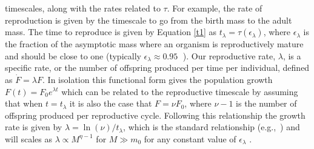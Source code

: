 \documentclass[twocolumn,preprintnumbers,amsmath,amssymb,superscriptaddress]{revtex4}
\begin{document}
\begin{bibunit}[unsrt]
{  timescales, along with the rates related to $\tau$.  For example, the rate of
  reproduction is given by the timescale to go from the birth mass to the adult
  mass. The time to reproduce is given by Equation \ref{t1} as
  $t_{\lambda}=\tau\left(\epsilon_{\lambda}\right)$, where $\epsilon_{\lambda}$
  is the fraction of the asymptotic mass where an organism is reproductively
  mature and should be close to one (typically
  $\epsilon_{\lambda}\approx0.95\;$ \citep{West:2001bv}). Our reproductive
  rate, $\lambda$, is a specific rate, or the number of offspring produced per
  time per individual, defined as $\dot{F} = \lambda F$. In isolation this
  functional form gives the population growth
  $F\left(t\right) = F_{0}e^{\lambda t}$ which can be related to the
  reproductive timescale by assuming that when $t=t_{\lambda}$ it is also the
  case that $F=\nu F_{0}$, where $\nu-1$ is the number of offspring produced
  per reproductive cycle. Following this relationship the growth rate is given
  by $\lambda=\ln\left(\nu\right)/t_{\lambda}$, which is the standard
  relationship (e.g.,~\cite{Savage:2004ed}) and will scales as
  $\lambda\propto M^{\eta-1}$ for $M\gg m_{0}$ for any constant value of
  $\epsilon_{\lambda}$
  \citep{West:2001bv,moses2008rmo,gillooly2002esa,hou,Kempes:2012hy}.


}
\end{bibunit}
\end{document}
